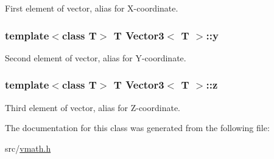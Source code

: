 First element of vector, alias for X-\/coordinate. 

\hypertarget{class_vector3_a561df88b28e106e337a25bb86554a569}{
\subsubsection[{y}]{\setlength{\rightskip}{0pt plus 5cm}template$<$class T$>$ T {\bf Vector3}$<$ T $>$::{\bf y}}}
\label{class_vector3_a561df88b28e106e337a25bb86554a569}


Second element of vector, alias for Y-\/coordinate. 

\hypertarget{class_vector3_ab3e7f5401dd6e951978bfa746809f74f}{
\subsubsection[{z}]{\setlength{\rightskip}{0pt plus 5cm}template$<$class T$>$ T {\bf Vector3}$<$ T $>$::{\bf z}}}
\label{class_vector3_ab3e7f5401dd6e951978bfa746809f74f}


Third element of vector, alias for Z-\/coordinate. 



The documentation for this class was generated from the following file:\begin{DoxyCompactItemize}
\item 
src/\hyperlink{vmath_8h}{vmath.h}\end{DoxyCompactItemize}
